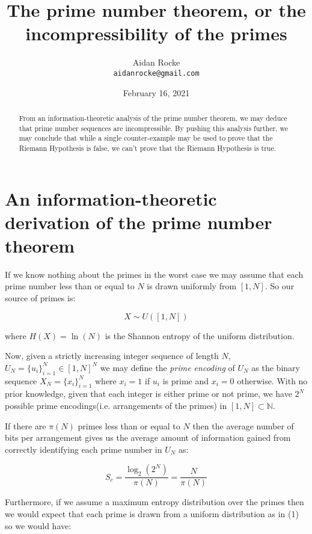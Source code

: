 \documentclass{article}
\title{The prime number theorem, or the incompressibility of the primes}
\date{February 16, 2021}
\author{%
  Aidan Rocke\\
  \texttt{aidanrocke@gmail.com} \\
}
\begin{document}
\maketitle

\begin{abstract}
   From an information-theoretic analysis of the prime number theorem, we may deduce that prime number sequences are incompressible. By pushing this analysis further, we may conclude that while a single counter-example may be used to prove that the Riemann Hypothesis is false, we can't prove that the Riemann Hypothesis is true. 
   \end{abstract}

\section{An information-theoretic derivation of the prime number theorem}

If we know nothing about the primes in the worst case we may assume that each prime number less than or equal to $N$ is drawn uniformly from $[1,N]$. So our source of primes is:

\begin{equation}
X \sim U([1,N])
\end{equation}

where $H(X) = \ln(N)$ is the Shannon entropy of the uniform distribution.  

Now, given a strictly increasing integer sequence of length $N$, $U_N = \{u_i\}_{i=1}^N \in [1,N]^N$ we may define the \textit{prime encoding} of $U_N$ as the binary sequence $X_N = \{x_i\}_{i=1}^N$ where $x_i =1$ if $u_i$ is prime and
$x_i=0$ otherwise. With no prior knowledge, given that each integer is either prime or not prime,
we have $2^N$ possible prime encodings(i.e. arrangements of the primes) in $[1,N] \subset \mathbb{N}$.

If there are $\pi(N)$ primes less than or equal to $N$ then the average number of bits per arrangement gives us the average amount of information gained from correctly identifying each prime number in $U_N$ as:

\begin{equation}
S_c = \frac{\log_2 (2^N)}{\pi(N)}= \frac{N}{\pi(N)}
\end{equation}

Furthermore, if we assume a maximum entropy distribution over the primes then we would expect that each prime is drawn from a uniform distribution as in (1) so we would have:
\end{document}
